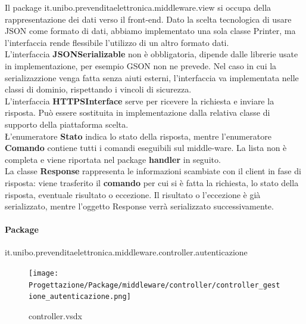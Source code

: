 \documentclass[a4paper]{article}
\begin{document}
Il package it.unibo.prevenditaelettronica.middleware.view si occupa della rappresentazione dei dati verso il front-end. Dato la scelta tecnologica di usare JSON come formato di dati, abbiamo implementato una sola classe Printer, ma l'interfaccia rende flessibile l'utilizzo di un altro formato dati.\\L'interfaccia \textbf{JSONSerializable} non è obbligatoria, dipende dalle librerie usate in implementazione, per esempio GSON non ne prevede. Nel caso in cui la serializazzione venga fatta senza aiuti esterni, l'interfaccia va implementata nelle classi di dominio, rispettando i vincoli di sicurezza.\\L'interfaccia \textbf{HTTPSInterface} serve per ricevere la richiesta e inviare la risposta. Può essere sostituita in implementazione dalla relativa classe di supporto della piattaforma scelta.\\\L'enumeratore \textbf{Stato} indica lo stato della risposta, mentre l'enumeratore \textbf{Comando} contiene tutti i comandi eseguibili sul middle-ware. La lista non è completa e viene riportata nel package \textbf{handler} in seguito.\\La classe \textbf{Response} rappresenta le informazioni scambiate con il client in fase di risposta: viene trasferito il \textbf{comando} per cui si è fatta la richiesta, lo stato della risposta, eventuale risultato o eccezione. Il risultato o l'eccezione è già serializzato, mentre l'oggetto Response verrà serializzato successivamente.

\newpage


\paragraph{Package} it.unibo.prevenditaelettronica.middleware.controller.autenticazione


\begin{figure}[H]
    \texttt{[image: Progettazione/Package/middleware/controller/controller\_gestione\_autenticazione.png]}
    \centering
    \caption{controller.vsdx}
\end{figure}
\end{document}

